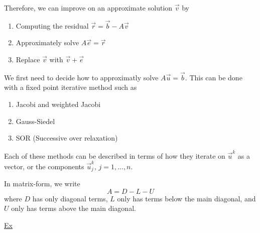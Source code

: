 Therefore, we can improve on an approximate solution $\vec{v}$ by
\begin{enumerate}[1)]
\item Computing the residual $\vec{r} = \vec{b} - A\vec{v}$
\item Approximately solve $A\vec{e}=\vec{r}$
\item Replace $\vec{v}$ with $\vec{v}+\vec{e}$
\end{enumerate}

We first need to decide how to approximatly solve $A\vec{u}=\vec{b}$. This can
be done with a fixed point iterative method such as

\begin{enumerate}[1)]
\item Jacobi and weighted Jacobi
\item Gauss-Siedel
\item SOR (Successive over relaxation)
\end{enumerate}

Each of these methods can be described in terms of how they iterate on
$\vec{u}^k$ as a vector, or the components $\vec{u}_j^k,\,j=1,\ldots, n$.

In matrix-form, we write
\begin{equation*}
A=D-L - U
\end{equation*}
where $D$ has only diagonal terms, $L$ only has terms below the main diagonal,
and $U$ only has terms above the main diagonal.

\underline{Ex}

